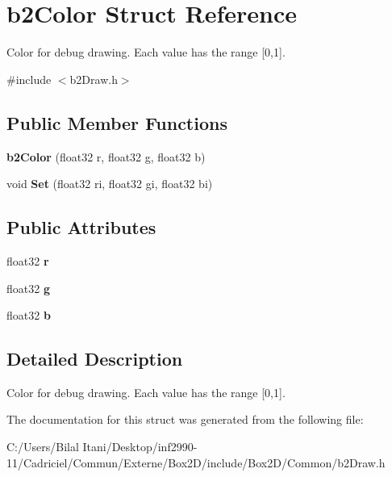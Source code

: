 \hypertarget{structb2_color}{}\section{b2\+Color Struct Reference}
\label{structb2_color}


Color for debug drawing. Each value has the range \mbox{[}0,1\mbox{]}.  




{\ttfamily \#include $<$b2\+Draw.\+h$>$}

\subsection*{Public Member Functions}
\begin{DoxyCompactItemize}
\item 
{\bfseries b2\+Color} (float32 r, float32 g, float32 b)\hypertarget{structb2_color_abddfc60d402d691542a224921868bfb7}{}\label{structb2_color_abddfc60d402d691542a224921868bfb7}

\item 
void {\bfseries Set} (float32 ri, float32 gi, float32 bi)\hypertarget{structb2_color_af35a718911e10a54fa8aaa86367a5b56}{}\label{structb2_color_af35a718911e10a54fa8aaa86367a5b56}

\end{DoxyCompactItemize}
\subsection*{Public Attributes}
\begin{DoxyCompactItemize}
\item 
float32 {\bfseries r}\hypertarget{structb2_color_a9ab6c9a910caee177d96980b74ffb00b}{}\label{structb2_color_a9ab6c9a910caee177d96980b74ffb00b}

\item 
float32 {\bfseries g}\hypertarget{structb2_color_a241c742352403ec456b51ac5f2abe7d9}{}\label{structb2_color_a241c742352403ec456b51ac5f2abe7d9}

\item 
float32 {\bfseries b}\hypertarget{structb2_color_a9e7380d27a63010cfad49b97f66dcd26}{}\label{structb2_color_a9e7380d27a63010cfad49b97f66dcd26}

\end{DoxyCompactItemize}


\subsection{Detailed Description}
Color for debug drawing. Each value has the range \mbox{[}0,1\mbox{]}. 

The documentation for this struct was generated from the following file\+:\begin{DoxyCompactItemize}
\item 
C\+:/\+Users/\+Bilal Itani/\+Desktop/inf2990-\/11/\+Cadriciel/\+Commun/\+Externe/\+Box2\+D/include/\+Box2\+D/\+Common/b2\+Draw.\+h\end{DoxyCompactItemize}
